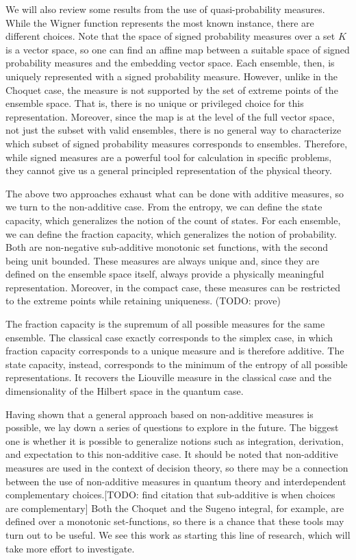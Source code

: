 \documentclass[10pt,twocolumn, nofootinbib]{revtex4-2}
\begin{document}
We will also review some results from the use of quasi-probability measures. While the Wigner function represents the most known instance, there are different choices. Note that the space of signed probability measures over a set $K$ is a vector space, so one can find an affine map between a suitable space of signed probability measures and the embedding vector space. Each ensemble, then, is uniquely represented with a signed probability measure. However, unlike in the Choquet case, the measure is not supported by the set of extreme points of the ensemble space. That is, there is no unique or privileged choice for this representation. Moreover, since the map is at the level of the full vector space, not just the subset with valid ensembles, there is no general way to characterize which subset of signed probability measures corresponds to ensembles. Therefore, while signed measures are a powerful tool for calculation in specific problems, they cannot give us a general principled representation of the physical theory.

The above two approaches exhaust what can be done with additive measures, so we turn to the non-additive case. From the entropy, we can define the state capacity, which generalizes the notion of the count of states. For each ensemble, we can define the fraction capacity, which generalizes the notion of probability. Both are non-negative sub-additive monotonic set functions, with the second being unit bounded. These measures are always unique and, since they are defined on the ensemble space itself, always provide a physically meaningful representation. Moreover, in the compact case, these measures can be restricted to the extreme points while retaining uniqueness. (TODO: prove)

The fraction capacity is the supremum of all possible measures for the same ensemble. The classical case exactly corresponds to the simplex case, in which fraction capacity corresponds to a unique measure and is therefore additive. The state capacity, instead, corresponds to the minimum of the entropy of all possible representations. It recovers the Liouville measure in the classical case and the dimensionality of the Hilbert space in the quantum case.

Having shown that a general approach based on non-additive measures is possible, we lay down a series of questions to explore in the future. The biggest one is whether it is possible to generalize notions such as integration, derivation, and expectation to this non-additive case.  It should be noted that non-additive measures are used in the context of decision theory, so there may be a connection between the use of non-additive measures in quantum theory and interdependent complementary choices.[TODO: find citation that sub-additive is when choices are complementary] Both the Choquet and the Sugeno integral, for example, are defined over a monotonic set-functions, so there is a chance that these tools may turn out to be useful. We see this work as starting this line of research, which will take more effort to investigate.
\end{document}
